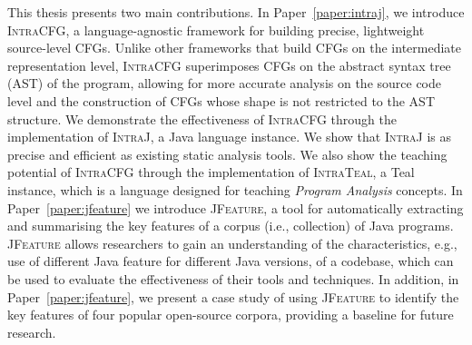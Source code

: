 This thesis presents two main contributions.
In Paper~\ref{paper:intraj},  we introduce \textsc{IntraCFG}, a language-agnostic framework for building
precise, lightweight source-level CFGs. Unlike other frameworks that
build CFGs on the intermediate representation level, \textsc{IntraCFG} superimposes
CFGs on the abstract syntax tree (AST) of the program, allowing for more accurate
analysis on the source code level and the construction of CFGs whose shape is not
restricted to the AST structure. We demonstrate the effectiveness
of \textsc{IntraCFG} through the implementation of \textsc{IntraJ}, a Java language
instance. We show that \textsc{IntraJ} is as precise and efficient as existing
static analysis tools. We also show the teaching potential of \textsc{IntraCFG}
through the implementation of \textsc{IntraTeal}, a Teal instance, which
is a language designed for teaching \emph{Program Analysis} concepts.
In Paper~\ref{paper:jfeature} we introduce \textsc{JFeature}, a tool for automatically extracting and summarising
the key features of a corpus (i.e., collection) of Java programs. \textsc{JFeature}
allows researchers to gain an understanding of the characteristics, e.g.,
use of different Java feature for different Java versions, of a codebase,
which can be used to evaluate the effectiveness of their tools and techniques.
In addition, in Paper~\ref{paper:jfeature}, we present a case study of using \textsc{JFeature} to
identify the key features of four popular open-source corpora, providing a
baseline for future research.
